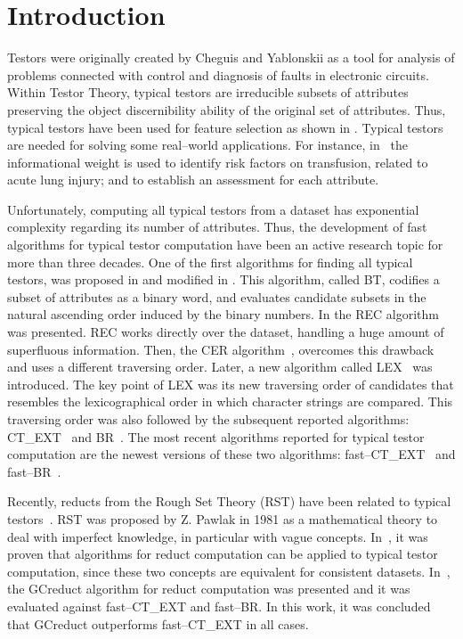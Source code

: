 \documentclass[citenumber]{llncs}
\begin{document}
\section{Introduction}
%
	
	Testors were originally created by Cheguis and Yablonskii \cite{Cheguis55} as a tool for analysis of problems connected with control and diagnosis of faults in electronic circuits.  Within Testor Theory, typical testors are irreducible subsets of attributes preserving the object discernibility ability of the original set of attributes. Thus, typical testors have been used for feature selection as shown in \cite{Dmitriev1966,Ruiz08}. Typical testors are needed for solving some real--world applications. For instance, in~\cite{Torres2014} the informational weight is used to identify risk factors on transfusion, related to acute lung injury; and to establish an assessment for each attribute. 
	
	Unfortunately, computing all typical testors from a dataset has exponential complexity regarding its number of attributes. Thus, the development of fast algorithms for typical testor computation have been an active research topic for more than three decades. One of the first algorithms for finding all typical testors, was proposed in \cite{Ruiz85} and modified in \cite{sanchez02}. This algorithm, called BT, codifies a subset of attributes as a binary word, and evaluates candidate subsets in the natural ascending order induced by the binary numbers.  In \cite{Shulcloper95b} the REC algorithm was presented. REC works directly over the dataset, handling a huge amount of superfluous information. Then, the CER algorithm~\cite{Ayaquica97}, overcomes this drawback and uses a different traversing order. Later, a new algorithm called LEX~\cite{Santiesteban03} was introduced. The key point of LEX was its new traversing order of candidates that resembles the lexicographical order in which character strings are compared. This traversing order was also followed by the subsequent reported algorithms: CT\_EXT~\cite{Sanchez07} and BR~\cite{Lias09}. The most recent algorithms reported for typical testor computation are the newest versions of these two algorithms: fast--CT\_EXT~\cite{Sanchez10} and fast--BR~\cite{Lias13}.
	
	
	Recently, reducts from the Rough Set Theory (RST) have been related to typical testors~\cite{Chikalov2013}. RST was proposed by Z. Pawlak in 1981 \cite{Pawlak81} as a mathematical theory to deal with imperfect knowledge, in particular with vague concepts. In~\cite{Lazo15}, it was proven that algorithms for reduct computation can be applied to typical testor computation, since these two concepts are equivalent for consistent datasets. In~\cite{Rodriguez2018}, the GCreduct algorithm for reduct computation was presented and it was evaluated against fast--CT\_EXT and fast--BR. In this work, it was concluded that GCreduct outperforms fast--CT\_EXT in all cases.
	
\end{document}
